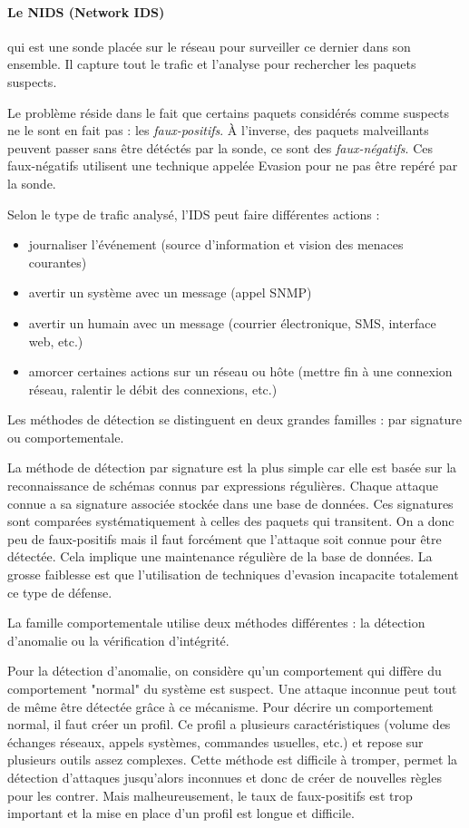 \documentclass[a4paper,11pt,french]{article}
\begin{document}
\paragraph{Le NIDS (Network IDS)} qui est une sonde placée sur le réseau pour surveiller ce dernier dans son ensemble. Il capture tout le trafic et l’analyse pour rechercher les paquets suspects.


Le problème réside dans le fait que certains paquets considérés comme suspects ne le sont en fait pas : les \emph{faux-positifs}.
À l’inverse, des paquets malveillants peuvent passer sans être détéctés par la sonde, ce sont des \emph{faux-négatifs}.
Ces faux-négatifs utilisent une technique appelée Evasion pour ne pas être repéré par la sonde.


Selon le type de trafic analysé, l’IDS peut faire différentes actions :
\begin{itemize}
\item journaliser l’événement (source d’information et vision des menaces courantes)
\item avertir un système avec un message (appel SNMP)
\item avertir un humain avec un message (courrier électronique, SMS, interface web, etc.)
\item amorcer certaines actions sur un réseau ou hôte (mettre fin à une connexion réseau, ralentir le débit des connexions, etc.)
\end{itemize}

Les méthodes de détection se distinguent en deux grandes familles : par signature ou comportementale.


La méthode de détection par signature est la plus simple car elle est basée sur la reconnaissance de schémas connus par expressions régulières.
Chaque attaque connue a sa signature associée stockée dans une base de données.
Ces signatures sont comparées systématiquement à celles des paquets qui transitent.
On a donc peu de faux-positifs mais il faut forcément que l’attaque soit connue pour être détectée. Cela implique une maintenance régulière de la base de données.
La grosse faiblesse est que l’utilisation de techniques d’evasion incapacite totalement ce type de défense.

La famille comportementale utilise deux méthodes différentes : la détection d’anomalie ou la vérification d’intégrité.

Pour la détection d’anomalie, on considère qu’un comportement qui diffère du comportement "normal" du système est suspect. Une attaque inconnue peut tout de même être détectée grâce à ce mécanisme.
Pour décrire un comportement normal, il faut créer un profil.
Ce profil a plusieurs caractéristiques (volume des échanges réseaux, appels systèmes, commandes usuelles, etc.) et repose sur plusieurs outils assez complexes.
Cette méthode est difficile à tromper, permet la détection d’attaques jusqu’alors inconnues et donc de créer de nouvelles règles pour les contrer.
Mais malheureusement, le taux de faux-positifs est trop important et la mise en place d’un profil est longue et difficile.
\end{document}
